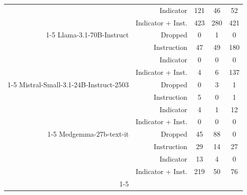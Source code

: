 \documentclass[11pt]{article}
\begin{document}
\begin{table}[htbp]
{\begin{tabular}{rrccc}
     & Indicator & 121 & 46 & 52 \\
     & Indicator + Inst. & 423 & 280 & 421 \\
    \cline{1-5}
    Llama-3.1-70B-Instruct& Dropped & 0 & 1 & 0 \\
     & Instruction & 47 & 49 & 180 \\
     & Indicator & 0 & 0 & 0 \\
     & Indicator + Inst. & 4 & 6 & 137 \\
    \cline{1-5}
    Mistral-Small-3.1-24B-Instruct-2503& Dropped & 0 & 3 & 1 \\
     & Instruction & 5 & 0 & 1 \\
     & Indicator & 4 & 1 & 12 \\
     & Indicator + Inst. & 0 & 0 & 0 \\
    \cline{1-5}
    Medgemma-27b-text-it& Dropped & 45 & 88 & 0 \\
     & Instruction & 29 & 14 & 27 \\
     & Indicator & 13 & 4 & 0 \\
     & Indicator + Inst. & 219 & 50 & 76 \\
    \cline{1-5}
    \bottomrule
    \end{tabular}
}
\end{table}
\end{document}
